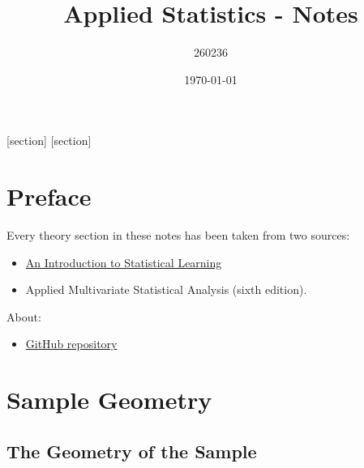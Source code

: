 \documentclass[a4paper]{article}
\begin{document}
    [section]
    [section]
    
    

    \author{260236}
	\title{Applied Statistics - Notes}
	\date{\printdayoff\today}
	\maketitle

	\newpage

    \section*{Preface}

    Every theory section in these notes has been taken from two sources:
    \begin{itemize}
        \item \href{https://www.statlearning.com/}{An Introduction to Statistical Learning}\cite{james2013introduction}
        \item Applied Multivariate Statistical Analysis (sixth edition).\cite{johnson2007applied}
    \end{itemize}
    About:
    \begin{itemize}
        \item[\faIcon{github}] \href{https://github.com/AndreVale69/HPC-E-PoliMI-university-notes}{GitHub repository}
    \end{itemize}
    
    \newpage
	
	\tableofcontents
	
	\newpage

    \section{Sample Geometry}

    \subsection{The Geometry of the Sample}
\end{document}
